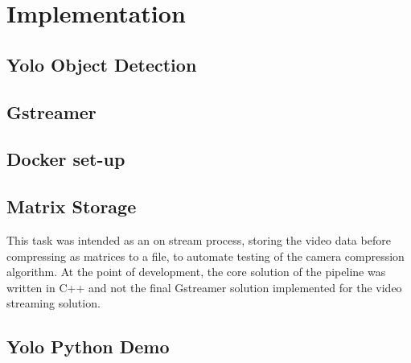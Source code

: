 \graphicspath{{figures/implementation/}}
\chapter{Implementation}\label{ch:implementation}\glsresetall

\section{Yolo Object Detection}

\section{Gstreamer}

\section{Docker set-up}

\section{Matrix Storage}
This task was intended as an on stream process, storing the video data before compressing as matrices to a file, to automate testing of the camera compression algorithm. At the point of development, the core solution of the pipeline was written in C++ and not the final Gstreamer solution implemented for the video streaming solution.

\section{Yolo Python Demo}